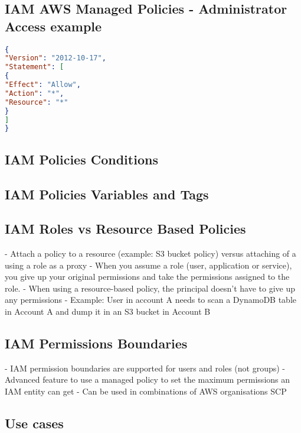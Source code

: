 \documentclass[11pt]{book}
\begin{document}
    \subsection{IAM AWS Managed Policies - Administrator Access example}

    \begin{lstlisting}[language=JSON, caption=Sample JSON Data, label=lst:json-example]
{
"Version": "2012-10-17",
"Statement": [
{
"Effect": "Allow",
"Action": "*",
"Resource": "*"
}
]
}
    \end{lstlisting}

    \subsection{IAM Policies Conditions}

    \subsection{IAM Policies Variables and Tags}

    \subsection{IAM Roles vs Resource Based Policies}
    - Attach a policy to a resource (example: S3 bucket policy) versus attaching of a using a role as a proxy
    - When you assume a role (user, application or service), you give up your original permissions and take the permissions assigned to the role.
    - When using a resource-based policy, the principal doesn't have to give up any permissions
    - Example: User in account A needs to scan a DynamoDB table in Account A and dump it in an S3 bucket in Account B

    \subsection{IAM Permissions Boundaries}
    - IAM permission boundaries are supported for users and roles (not groups)
    - Advanced feature to use a managed policy to set the maximum permissions an IAM entity can get
    - Can be used in combinations of AWS organisations SCP

    \subsection{Use cases}
\end{document}

